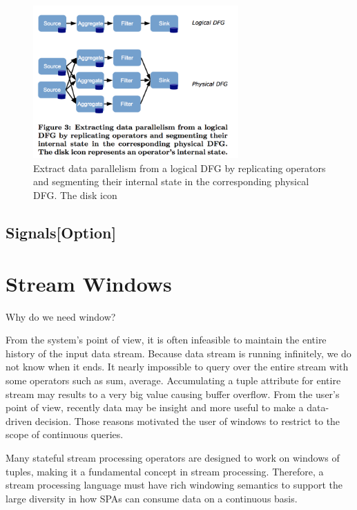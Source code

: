 \begin{figure}[htbp!] 
\centering    
\includegraphics[width=0.7\textwidth]{logicalPhysicalDataFlow}
\caption[Minion]{Extract data parallelism from a logical DFG by replicating operators and segmenting their internal state in the corresponding physical DFG. The disk icon \citep{Henrique:2013}}
\label{fig:streamRepresent}
\end{figure}

   
\subsection*{Signals[Option]}    \citep{Golab:2010} 
    
    
\section{Stream Windows}

Why do we need window?

From the system's point of view, it is often infeasible to maintain the entire history of the input data stream. Because data stream is running infinitely, we do not know when it ends. It nearly impossible to query over the entire stream with some operators such as sum, average. Accumulating a tuple attribute for entire stream may results to a very big value causing  buffer overflow. From the user's point of view, recently data may be insight and more useful to make a data-driven decision. Those reasons motivated the user of windows to restrict to the scope of continuous queries. 

Many stateful stream processing operators are designed to work on windows of tuples, making it a fundamental concept in stream processing. Therefore, a stream processing language must have rich windowing semantics to support the large diversity in how SPAs can consume data on a continuous basis.

